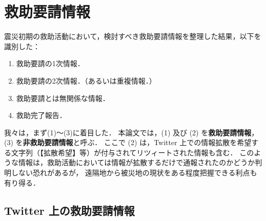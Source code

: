 \documentclass[japanese]{jnlp_1.4}
\begin{document}
\section{救助要請情報}
\label{request}

震災初期の救助活動において，検討すべき救助要請情報を整理した結果，以下を識別した：
\begin{enumerate}
\item 
  救助要請の1次情報．
\item 
  救助要請の2次情報．（あるいは重複情報．）
\item 
  救助要請とは無関係な情報．
\item 
  救助完了報告．
\end{enumerate}
我々は，まず(1)〜(3)に着目した．
本論文では，(1) 及び (2) を{\bf 救助要請情報}，
(3) を{\bf 非救助要請情報}と呼ぶ．
ここで (2) は，Twitter 上での情報拡散を希望する文字列（【拡散希望】等）が付与されてリツィートされた情報も含む．
このような情報は，救助活動においては情報が拡散するだけで通報されたのかどうか判明しない恐れがあるが，
遠隔地から被災地の現状をある程度把握できる利点も有り得る．


\subsection{Twitter 上の救助要請情報}
\end{document}
